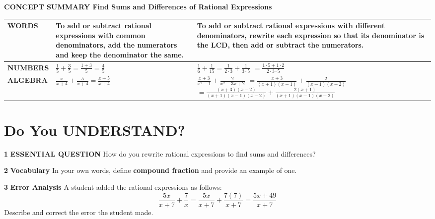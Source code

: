 \documentclass{article}
\newenvironment{concept-summary}{}{}
\newenvironment{practice}[2]{\textbf{#1}\quad}{\par}
\newcommand{\answer}[1]{}
\begin{document}
\begin{concept-summary}
\textbf{CONCEPT SUMMARY Find Sums and Differences of Rational Expressions}

\begin{tabular}{p{2cm} p{5.5cm} p{5.5cm}}
\toprule
\textbf{WORDS} & To add or subtract rational expressions with common denominators, add the numerators and keep the denominator the same. & To add or subtract rational expressions with different denominators, rewrite each expression so that its denominator is the LCD, then add or subtract the numerators. \\
\midrule
\textbf{NUMBERS} & $\frac{1}{5} + \frac{3}{5} = \frac{1 + 3}{5} = \frac{4}{5}$ & $\frac{1}{6} + \frac{1}{15} = \frac{1}{2 \cdot 3} + \frac{1}{3 \cdot 5}$ \newline $= \frac{1 \cdot 5 + 1 \cdot 2}{2 \cdot 3 \cdot 5}$ \\
\midrule
\textbf{ALGEBRA} & $\frac{x}{x + 4} + \frac{5}{x + 4} = \frac{x + 5}{x + 4}$ & $\frac{x + 3}{x^2 - 1} + \frac{2}{x^2 - 3x + 2}$ \newline $= \frac{x + 3}{(x + 1)(x - 1)} + \frac{2}{(x - 1)(x - 2)}$ \newline $= \frac{(x + 3)(x - 2)}{(x + 1)(x - 1)(x - 2)} + \frac{2(x + 1)}{(x + 1)(x - 1)(x - 2)}$ \\
\bottomrule
\end{tabular}
\end{concept-summary}

\section*{Do You UNDERSTAND?}
\begin{practice}{1}{unknown}
\textbf{ESSENTIAL QUESTION} How do you rewrite rational expressions to find sums and differences?
\answer{}
\end{practice}

\begin{practice}{2}{unknown}
\textbf{Vocabulary} In your own words, define \textbf{compound fraction} and provide an example of one.
\answer{}
\end{practice}

\begin{practice}{3}{unknown}
\textbf{Error Analysis} A student added the rational expressions as follows:
\[ \frac{5x}{x + 7} + \frac{7}{x} = \frac{5x}{x + 7} + \frac{7(7)}{x + 7} = \frac{5x + 49}{x + 7} \]
Describe and correct the error the student made.
\answer{}
\end{practice}
\end{document}
